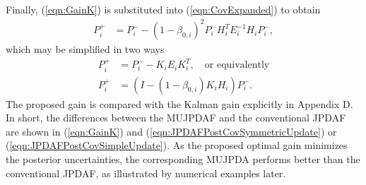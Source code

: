 \documentclass[letterpaper, paper,10pt]{AAS}		%
\newcommand{\refeqn}[1]{(\ref{eqn:#1})}
\begin{document}
Finally, \refeqn{GainK} is substituted into \refeqn{CovExpanded} to obtain
\begin{align}
\label{eqn:PNotSimplified}
P^+_{i}&=P^-_{i}-(1-\beta_{0,i})^2P^-_iH_i^TE_i^{-1}H_iP^-_i,
\end{align}
which may be simplified in two ways
\begin{align}
P^+_{i}&=P^-_{i}-K_iE_iK_i^T, \quad \mbox{or equivalently}\label{eqn:JPDAFPostCovSymmetricUpdate}
\\
P^+_{i}&=\left(I-(1-\beta_{0,i})K_iH_i\right)P^-_i.\label{eqn:JPDAFPostCovSimpleUpdate}
\end{align}
The proposed gain is compared with the Kalman gain explicitly in Appendix D.
In short, the differences between the MUJPDAF and the conventional JPDAF are shown in \refeqn{GainK} and \refeqn{JPDAFPostCovSymmetricUpdate} or \refeqn{JPDAFPostCovSimpleUpdate}. As the proposed optimal gain minimizes the posterior uncertainties, the corresponding MUJPDA performs better than the conventional JPDAF, as illustrated by numerical examples later.
\end{document}
